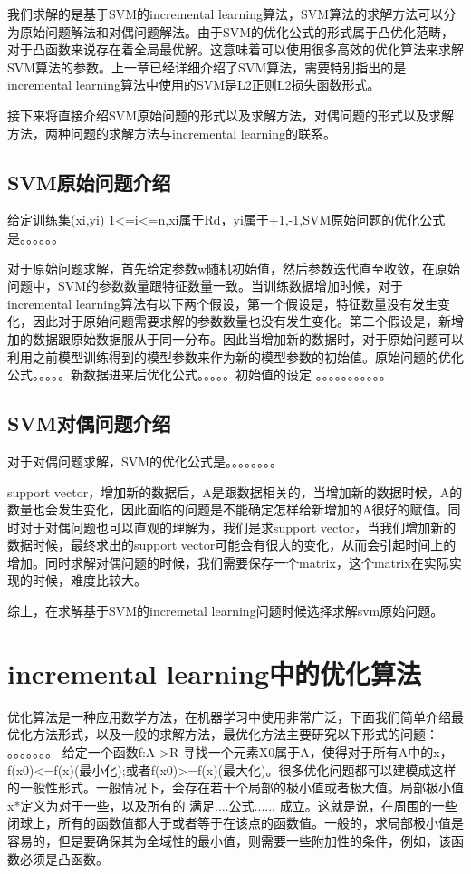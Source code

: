 \documentclass[master]{njuthesis}
\begin{document}
\begin{enumerate}
\begin{enumerate}
\begin{enumerate}
    我们求解的是基于SVM的incremental learning算法，SVM算法的求解方法可以分为原始问题解法和对偶问题解法。由于SVM的优化公式的形式属于凸优化范畴，对于凸函数来说存在着全局最优解。这意味着可以使用很多高效的优化算法来求解SVM算法的参数。上一章已经详细介绍了SVM算法，需要特别指出的是incremental learning算法中使用的SVM是L2正则L2损失函数形式。

    接下来将直接介绍SVM原始问题的形式以及求解方法，对偶问题的形式以及求解方法，两种问题的求解方法与incremental learning的联系。

\subsection{SVM原始问题介绍}

    给定训练集{(xi,yi)} 1<=i<=n,xi属于Rd，yi属于{+1,-1},SVM原始问题的优化公式是。。。。。。

    对于原始问题求解，首先给定参数w随机初始值，然后参数迭代直至收敛，在原始问题中，SVM的参数数量跟特征数量一致。当训练数据增加时候，对于incremental learning算法有以下两个假设，第一个假设是，特征数量没有发生变化，因此对于原始问题需要求解的参数数量也没有发生变化。第二个假设是，新增加的数据跟原始数据服从于同一分布。因此当增加新的数据时，对于原始问题可以利用之前模型训练得到的模型参数来作为新的模型参数的初始值。原始问题的优化公式。。。。。新数据进来后优化公式。。。。。初始值的设定  。。。。。。。。。。。

\subsection{SVM对偶问题介绍}
    
    对于对偶问题求解，SVM的优化公式是。。。。。。。。
    
    support vector，增加新的数据后，A是跟数据相关的，当增加新的数据时候，A的数量也会发生变化，因此面临的问题是不能确定怎样给新增加的A很好的赋值。同时对于对偶问题也可以直观的理解为，我们是求support vector，当我们增加新的数据时候，最终求出的support vector可能会有很大的变化，从而会引起时间上的增加。同时求解对偶问题的时候，我们需要保存一个matrix，这个matrix在实际实现的时候，难度比较大。
    
    综上，在求解基于SVM的incremetal learning问题时候选择求解svm原始问题。


\section{incremental learning中的优化算法}

    优化算法是一种应用数学方法，在机器学习中使用非常广泛，下面我们简单介绍最优化方法形式，以及一般的求解方法，最优化方法主要研究以下形式的问题：
    。。。。。。。
    给定一个函数f:A->R 寻找一个元素X0属于A，使得对于所有A中的x，f(x0)<=f(x)(最小化);或者f(x0)>=f(x)(最大化)。很多优化问题都可以建模成这样的一般性形式。一般情况下，会存在若干个局部的极小值或者极大值。局部极小值x*定义为对于一些，以及所有的 满足....公式......
成立。这就是说，在周围的一些闭球上，所有的函数值都大于或者等于在该点的函数值。一般的，求局部极小值是容易的，但是要确保其为全域性的最小值，则需要一些附加性的条件，例如，该函数必须是凸函数。
    

\end{enumerate}
\end{enumerate}
\end{enumerate}
\end{document}
